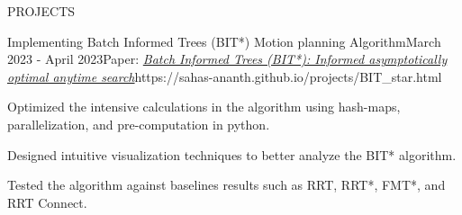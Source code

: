 \documentclass{resume} %
\begin{document}
\begin{rSection}{PROJECTS}
	\begin{rProjExpDetails}{Implementing Batch Informed Trees (BIT*) Motion planning Algorithm}{}{March 2023 - April 2023}{Paper: \href{https://journals.sagepub.com/doi/pdf/10.1177/0278364919890396}{\textit{Batch Informed Trees (BIT*): Informed asymptotically optimal anytime search}}}{https://sahas-ananth.github.io/projects/BIT_star.html}{}
		\item Optimized the intensive calculations in the algorithm using hash-maps, parallelization, and pre-computation in python.
		\item Designed intuitive visualization techniques to better analyze the BIT* algorithm.
		\item Tested the algorithm against baselines results such as RRT, RRT*, FMT*, and RRT Connect.
	\end{rProjExpDetails}

\end{rSection}
\end{document}
